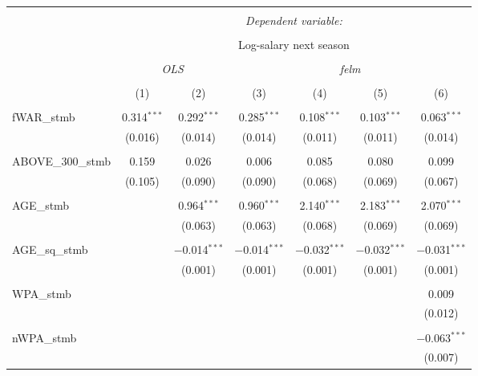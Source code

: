 
\begin{table}[!htbp] \centering
  \caption{}
  \label{}
  \scriptsize
\begin{tabular}{@{\extracolsep{5pt}}lcccccc}
\\[-1.8ex]\hline
\hline \\[-1.8ex]
 & \multicolumn{6}{c}{\textit{Dependent variable:}} \\
\cline{2-7}
\\[-1.8ex] & \multicolumn{6}{c}{Log-salary next season} \\
\\[-1.8ex] & \multicolumn{2}{c}{\textit{OLS}} & \multicolumn{4}{c}{\textit{felm}} \\
\\[-1.8ex] & (1) & (2) & (3) & (4) & (5) & (6)\\
\hline \\[-1.8ex]
 fWAR\_stmb & 0.314$^{***}$ & 0.292$^{***}$ & 0.285$^{***}$ & 0.108$^{***}$ & 0.103$^{***}$ & 0.063$^{***}$ \\
  & (0.016) & (0.014) & (0.014) & (0.011) & (0.011) & (0.014) \\
  & & & & & & \\
 ABOVE\_300\_stmb & 0.159 & 0.026 & 0.006 & 0.085 & 0.080 & 0.099 \\
  & (0.105) & (0.090) & (0.090) & (0.068) & (0.069) & (0.067) \\
  & & & & & & \\
 AGE\_stmb &  & 0.964$^{***}$ & 0.960$^{***}$ & 2.140$^{***}$ & 2.183$^{***}$ & 2.070$^{***}$ \\
  &  & (0.063) & (0.063) & (0.068) & (0.069) & (0.069) \\
  & & & & & & \\
 AGE\_sq\_stmb &  & $-$0.014$^{***}$ & $-$0.014$^{***}$ & $-$0.032$^{***}$ & $-$0.032$^{***}$ & $-$0.031$^{***}$ \\
  &  & (0.001) & (0.001) & (0.001) & (0.001) & (0.001) \\
  & & & & & & \\
 WPA\_stmb &  &  &  &  &  & 0.009 \\
  &  &  &  &  &  & (0.012) \\
  & & & & & & \\
 nWPA\_stmb &  &  &  &  &  & $-$0.063$^{***}$ \\
  &  &  &  &  &  & (0.007) \\

\end{tabular}
\end{table}
